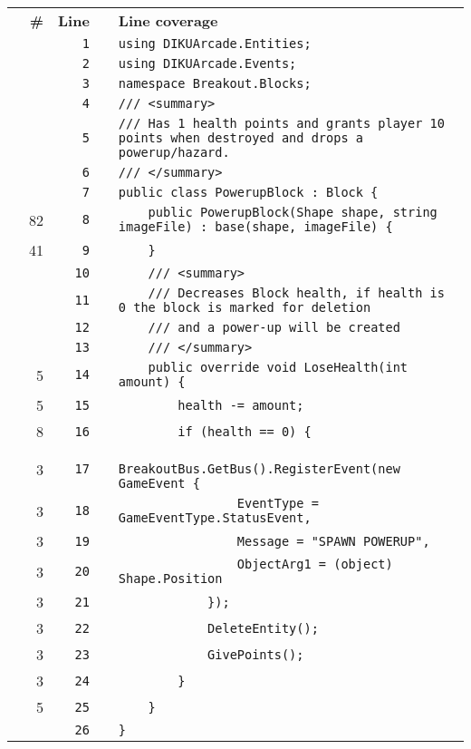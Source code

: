 \documentclass[a4paper,landscape,10pt]{article}
\begin{document}
\begin{longtable}[l]{lrrll}
\textbf{} & \textbf{\#} & \textbf{Line} & \textbf{} & \textbf{Line coverage}\\
\cellcolor{gray} &  & \verb~1~ & & \verb~using DIKUArcade.Entities;~\\
\cellcolor{gray} &  & \verb~2~ & & \verb~using DIKUArcade.Events;~\\
\cellcolor{gray} &  & \verb~3~ & & \verb~namespace Breakout.Blocks;~\\
\cellcolor{gray} &  & \verb~4~ & & \verb~/// <summary>~\\
\cellcolor{gray} &  & \verb~5~ & & \verb~/// Has 1 health points and grants player 10 points when destroyed and drops a powerup/hazard.~\\
\cellcolor{gray} &  & \verb~6~ & & \verb~/// </summary>~\\
\cellcolor{gray} &  & \verb~7~ & & \verb~public class PowerupBlock : Block {~\\
\cellcolor{green} & 82 & \verb~8~ & & \verb~    public PowerupBlock(Shape shape, string imageFile) : base(shape, imageFile) {~\\
\cellcolor{green} & 41 & \verb~9~ & & \verb~    }~\\
\cellcolor{gray} &  & \verb~10~ & & \verb~    /// <summary>~\\
\cellcolor{gray} &  & \verb~11~ & & \verb~    /// Decreases Block health, if health is 0 the block is marked for deletion~\\
\cellcolor{gray} &  & \verb~12~ & & \verb~    /// and a power-up will be created~\\
\cellcolor{gray} &  & \verb~13~ & & \verb~    /// </summary>~\\
\cellcolor{green} & 5 & \verb~14~ & & \verb~    public override void LoseHealth(int amount) {~\\
\cellcolor{green} & 5 & \verb~15~ & & \verb~        health -= amount;~\\
\cellcolor{green} & 8 & \verb~16~ & & \verb~        if (health == 0) {~\\
\cellcolor{green} & 3 & \verb~17~ & & \verb~            BreakoutBus.GetBus().RegisterEvent(new GameEvent {~\\
\cellcolor{green} & 3 & \verb~18~ & & \verb~                EventType = GameEventType.StatusEvent,~\\
\cellcolor{green} & 3 & \verb~19~ & & \verb~                Message = "SPAWN POWERUP",~\\
\cellcolor{green} & 3 & \verb~20~ & & \verb~                ObjectArg1 = (object) Shape.Position~\\
\cellcolor{green} & 3 & \verb~21~ & & \verb~            });~\\
\cellcolor{green} & 3 & \verb~22~ & & \verb~            DeleteEntity();~\\
\cellcolor{green} & 3 & \verb~23~ & & \verb~            GivePoints();~\\
\cellcolor{green} & 3 & \verb~24~ & & \verb~        }~\\
\cellcolor{green} & 5 & \verb~25~ & & \verb~    }~\\
\cellcolor{gray} &  & \verb~26~ & & \verb~}~\\
\end{longtable}
\newpage
\end{document}
